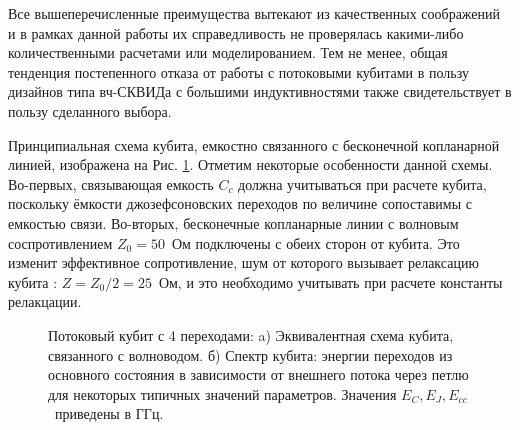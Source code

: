 Все вышеперечисленные преимущества вытекают из качественных соображений и в рамках данной работы их справедливость не проверялась какими-либо количественными расчетами или моделированием. Тем не менее, общая тенденция постепенного отказа от работы с потоковыми кубитами в пользу дизайнов типа вч-СКВИДа с большими индуктивностями также свидетельствует в пользу сделанного выбора. 

Принципиальная схема кубита, емкостно связанного с бесконечной копланарной линией, изображена на Рис. \ref{img: 4jj_flux_q}. Отметим некоторые особенности данной схемы. Во-первых, связывающая емкость $C_c$  должна учитываться при расчете кубита, поскольку ёмкости джозефсоновских переходов по величине сопоставимы с емкостью связи. Во-вторых, бесконечные копланарные линии с волновым соспротивлением $Z_0=50$~Ом подключены с обеих сторон от кубита. Это изменит эффективное сопротивление, шум от которого вызывает релаксацию кубита : $Z=Z_0/2=25$~Ом, и это необходимо учитывать при расчете константы релакцации.
 
\begin{figure}[h]
	{ \centering
		\hfill
		\def\svgwidth{2.8in}
		\fontsize{18pt}{18pt}\selectfont
		\hfill
		
		\hfill
	}
	\caption[Схема потокового кубита с четырьмя джозефсоновскими переходами и его спектр]{Потоковый кубит с 4 переходами: a) Эквивалентная схема кубита, связанного с волноводом.  б) Спектр кубита: энергии переходов из основного состояния в зависимости от внешнего потока через петлю для некоторых типичных значений параметров. Значения $E_C, E_J, E_{cc}$~приведены в ГГц. }
	\label{img: 4jj_flux_q}
\end{figure}

